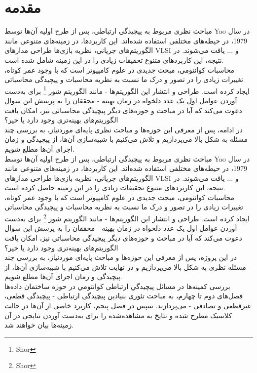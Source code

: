 \chapter{مقدمه}\label{intro}
مباحث نظری مربوط به پیچیدگی ارتباطی، پس از طرح اولیه آن‌ها توسط Yao در سال 1979، در حیطه‌های مختلفی استفاده شده‌اند. 
	این کاربرد‌ها، در زمینه‌‌های متنوعی مانند الگوریتم‌های جریانی، نظریه بازی‌ها‌‌ طراحی مدارهای VLSI و ... یافت می‌شوند.
	در نتیجه، این کاربردهای متنوع تحقیقات زیادی را در این زمینه شامل شده است.\\
	
محاسبات کوانتومی، مبحث جدیدی در علوم کامپیوتر است که با وجود عمر کوتاه، تغییرات زیادی را در تصور و درک ما نسبت به نظریه محاسبات و پیچیدگی محاسباتی ایجاد کرده است. 
طراحی و انتشار این الگوریتم‌ها - مانند الگوریتم شور \footnote{Shor} برای به‌دست آوردن عوامل اول یک عدد دلخواه در زمان بهینه - محققان را به پرسش این سوال دعوت می‌کند که آیا در مباحث و حوزه‌های دیگر پیچیدگی محاسباتی نیز، امکان یافت الگوریتم‌های بهینه‌تری وجود دارد یا خیر؟\\

در ادامه، پس از معرفی این حوزه‌ها و مباحث نظری پایه‌ای موردنیاز، به بررسی چند مسئله به شکل بالا می‌پردازیم و تلاش می‌کنیم با شبیه‌سازی آن‌ها، از پیچیدگی و زمان اجرای آن‌ها مطلع شویم.\\


مباحث نظری مربوط به پیچیدگی ارتباطی، پس از طرح اولیه آن‌ها توسط Yao در سال 1979، در حیطه‌های مختلفی استفاده شده‌اند. 
	این کاربرد‌ها، در زمینه‌‌های متنوعی مانند الگوریتم‌های جریانی، نظریه بازی‌ها‌‌ طراحی مدارهای VLSI و ... یافت می‌شوند.
	در نتیجه، این کاربردهای متنوع تحقیقات زیادی را در این زمینه حاصل کرده است.\\
	
محاسبات کوانتومی، مبحث جدیدی در علوم کامپیوتر است که با وجود عمر کوتاه، تغییرات زیادی را در تصور و درک ما نسبت به نظریه محاسبات و پیچیدگی محاسباتی ایجاد کرده است. 
طراحی و انتشار این الگوریتم‌ها - مانند الگوریتم شور \footnote{Shor} برای به‌دست آوردن عوامل اول یک عدد دلخواه در زمان بهینه - محققان را به پرسش این سوال دعوت می‌کند که آیا در مباحث و حوزه‌های دیگر پیچیدگی محاسباتی نیز، امکان یافت الگوریتم‌های بهینه‌تری وجود دارد یا خیر؟\\

در این پروژه، پس از معرفی این حوزه‌ها و مباحث پایه‌ای موردنیاز، به بررسی چند مسئله نظری به شکل بالا می‌پردازیم و در نهایت تلاش می‌کنیم با شبیه‌سازی آن‌ها، از پیچیدگی و زمان اجرای آن‌ها مطلع شویم.\\

بررسی کمینه‌ها در مسائل پيچيدگي ارتباطی كوانتومي در حوزه ساختمان داده‌ها
فصل‌های دوم تا چهارم، به مباحث تئوری بنیادین پیچیدگی ارتباطی - پیچیدگی قطعی، غیرقطعی و تصادفی - می‌پردازند. سپس در فصل پنجم، کاربرد خاصی از آن‌ها در حالت کلاسیک مطرح شده و نتایخ به مشاهده‌شده را برای به‌دست آوردن نتایجی در آن زمینه‌ها بیان خواهند شد.\\

